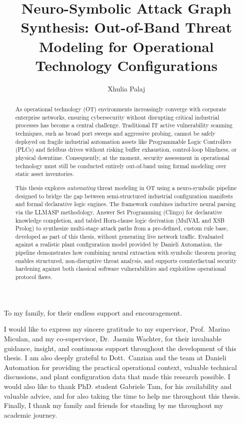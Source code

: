 \documentclass[target=mst,aauheader=aics,style=]{thud}
\title{Neuro-Symbolic Attack Graph Synthesis: Out-of-Band Threat Modeling for Operational Technology Configurations}
\author{Xhulia Palaj}
\begin{document}
\maketitle

\begin{dedication}
    To my family, for their endless support and encouragement.
\end{dedication}

\acknowledgements
I would like to express my sincere gratitude to my supervisor, Prof.\ Marino Miculan, and my co-supervisor, Dr.\ Jasmin Wachter, for their invaluable guidance, insight, and continuous support throughout the development of this thesis. I am also deeply grateful to Dott.\ Canzian and the team at Danieli Automation for providing the practical operational context, valuable technical discussions, and plant configuration data that made this research possible. I would also like to thank PhD. student Gabriele Tam, for his availability and valuable advice, and for also taking the time to help me throughout this thesis. Finally, I thank my family and friends for standing by me throughout my academic journey.

\begin{abstract}
As operational technology (OT) environments increasingly converge with corporate enterprise networks, ensuring cybersecurity without disrupting critical industrial processes has become a central challenge. Traditional IT active vulnerability scanning techniques, such as broad port sweeps and aggressive probing, cannot be safely deployed on fragile industrial automation assets like Programmable Logic Controllers (PLCs) and fieldbus drives without risking buffer exhaustion, control-loop blindness, or physical downtime. Consequently, at the moment, security assessment in operational technology must still be conducted entirely out-of-band using formal modeling over static asset inventories.

This thesis explores \textit{automating} threat modeling in OT using a neuro-symbolic pipeline designed to bridge the gap between semi-structured industrial configuration manifests and formal declarative logic engines. The framework combines inductive neural parsing via the LLMASP methodology, Answer Set Programming (Clingo) for declarative knowledge completion, and tabled Horn-clause logic derivation (MulVAL and XSB Prolog) to synthesize multi-stage attack paths from a pre-defined, custom rule base, developed as part of this thesis, without generating live network traffic. Evaluated against a realistic plant configuration model provided by Danieli Automation, the pipeline demonstrates how combining neural extraction with symbolic theorem proving enables structured, non-disruptive threat analysis, and supports counterfactual security hardening against both classical software vulnerabilities and exploitless operational protocol flaws.
\end{abstract}
\end{document}
